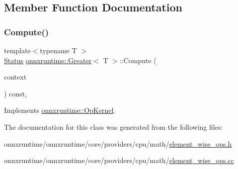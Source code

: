 \subsection{Member Function Documentation}
\mbox{\label{classonnxruntime_1_1Greater_a75aedc5e96d027c0096747117d54667c}} 
\subsubsection{\texorpdfstring{Compute()}{Compute()}}
{\footnotesize\ttfamily template$<$typename T $>$ \\
\mbox{\hyperlink{classonnxruntime_1_1common_1_1Status}{Status}} \mbox{\hyperlink{classonnxruntime_1_1Greater}{onnxruntime\+::\+Greater}}$<$ T $>$\+::Compute (\begin{DoxyParamCaption}\item[{\mbox{\hyperlink{classonnxruntime_1_1OpKernelContext}{Op\+Kernel\+Context}} $\ast$}]{context }\end{DoxyParamCaption}) const\hspace{0.3cm}{\ttfamily [override]}, {\ttfamily [virtual]}}



Implements \mbox{\hyperlink{classonnxruntime_1_1OpKernel_a9eca8656a78b1b3ab9d3351a12798650}{onnxruntime\+::\+Op\+Kernel}}.



The documentation for this class was generated from the following files\+:\begin{DoxyCompactItemize}
\item 
onnxruntime/onnxruntime/core/providers/cpu/math/\mbox{\hyperlink{element__wise__ops_8h}{element\+\_\+wise\+\_\+ops.\+h}}\item 
onnxruntime/onnxruntime/core/providers/cpu/math/\mbox{\hyperlink{element__wise__ops_8cc}{element\+\_\+wise\+\_\+ops.\+cc}}\end{DoxyCompactItemize}
